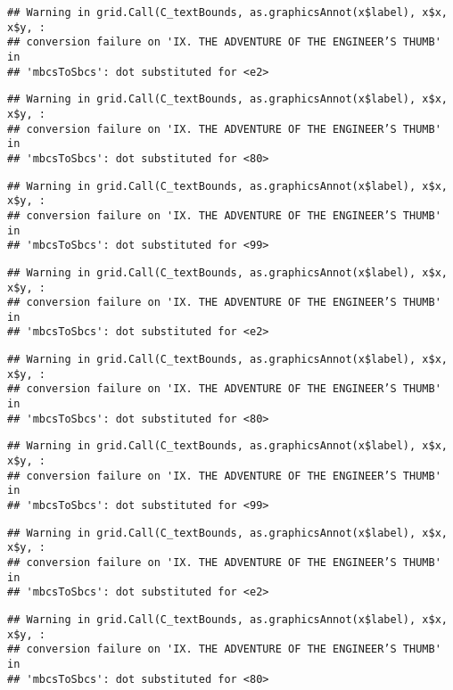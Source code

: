 \documentclass[
]{book}
\begin{document}
\begin{verbatim}
## Warning in grid.Call(C_textBounds, as.graphicsAnnot(x$label), x$x, x$y, :
## conversion failure on 'IX. THE ADVENTURE OF THE ENGINEER’S THUMB' in
## 'mbcsToSbcs': dot substituted for <e2>
\end{verbatim}

\begin{verbatim}
## Warning in grid.Call(C_textBounds, as.graphicsAnnot(x$label), x$x, x$y, :
## conversion failure on 'IX. THE ADVENTURE OF THE ENGINEER’S THUMB' in
## 'mbcsToSbcs': dot substituted for <80>
\end{verbatim}

\begin{verbatim}
## Warning in grid.Call(C_textBounds, as.graphicsAnnot(x$label), x$x, x$y, :
## conversion failure on 'IX. THE ADVENTURE OF THE ENGINEER’S THUMB' in
## 'mbcsToSbcs': dot substituted for <99>
\end{verbatim}

\begin{verbatim}
## Warning in grid.Call(C_textBounds, as.graphicsAnnot(x$label), x$x, x$y, :
## conversion failure on 'IX. THE ADVENTURE OF THE ENGINEER’S THUMB' in
## 'mbcsToSbcs': dot substituted for <e2>
\end{verbatim}

\begin{verbatim}
## Warning in grid.Call(C_textBounds, as.graphicsAnnot(x$label), x$x, x$y, :
## conversion failure on 'IX. THE ADVENTURE OF THE ENGINEER’S THUMB' in
## 'mbcsToSbcs': dot substituted for <80>
\end{verbatim}

\begin{verbatim}
## Warning in grid.Call(C_textBounds, as.graphicsAnnot(x$label), x$x, x$y, :
## conversion failure on 'IX. THE ADVENTURE OF THE ENGINEER’S THUMB' in
## 'mbcsToSbcs': dot substituted for <99>
\end{verbatim}

\begin{verbatim}
## Warning in grid.Call(C_textBounds, as.graphicsAnnot(x$label), x$x, x$y, :
## conversion failure on 'IX. THE ADVENTURE OF THE ENGINEER’S THUMB' in
## 'mbcsToSbcs': dot substituted for <e2>
\end{verbatim}

\begin{verbatim}
## Warning in grid.Call(C_textBounds, as.graphicsAnnot(x$label), x$x, x$y, :
## conversion failure on 'IX. THE ADVENTURE OF THE ENGINEER’S THUMB' in
## 'mbcsToSbcs': dot substituted for <80>
\end{verbatim}
\end{document}
